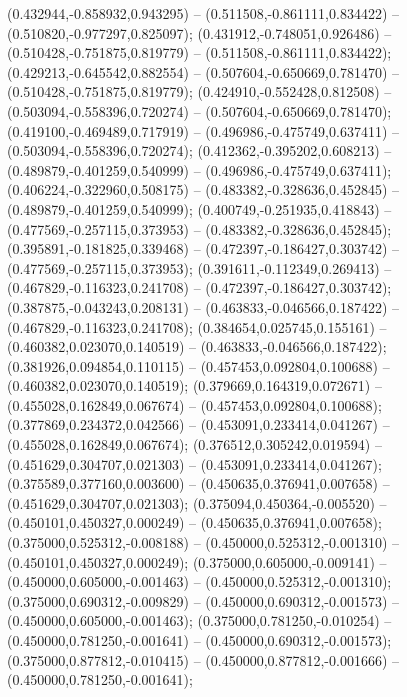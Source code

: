  (0.432944,-0.858932,0.943295) -- (0.511508,-0.861111,0.834422) -- (0.510820,-0.977297,0.825097);
 (0.431912,-0.748051,0.926486) -- (0.510428,-0.751875,0.819779) -- (0.511508,-0.861111,0.834422);
 (0.429213,-0.645542,0.882554) -- (0.507604,-0.650669,0.781470) -- (0.510428,-0.751875,0.819779);
 (0.424910,-0.552428,0.812508) -- (0.503094,-0.558396,0.720274) -- (0.507604,-0.650669,0.781470);
 (0.419100,-0.469489,0.717919) -- (0.496986,-0.475749,0.637411) -- (0.503094,-0.558396,0.720274);
 (0.412362,-0.395202,0.608213) -- (0.489879,-0.401259,0.540999) -- (0.496986,-0.475749,0.637411);
 (0.406224,-0.322960,0.508175) -- (0.483382,-0.328636,0.452845) -- (0.489879,-0.401259,0.540999);
 (0.400749,-0.251935,0.418843) -- (0.477569,-0.257115,0.373953) -- (0.483382,-0.328636,0.452845);
 (0.395891,-0.181825,0.339468) -- (0.472397,-0.186427,0.303742) -- (0.477569,-0.257115,0.373953);
 (0.391611,-0.112349,0.269413) -- (0.467829,-0.116323,0.241708) -- (0.472397,-0.186427,0.303742);
 (0.387875,-0.043243,0.208131) -- (0.463833,-0.046566,0.187422) -- (0.467829,-0.116323,0.241708);
 (0.384654,0.025745,0.155161) -- (0.460382,0.023070,0.140519) -- (0.463833,-0.046566,0.187422);
 (0.381926,0.094854,0.110115) -- (0.457453,0.092804,0.100688) -- (0.460382,0.023070,0.140519);
 (0.379669,0.164319,0.072671) -- (0.455028,0.162849,0.067674) -- (0.457453,0.092804,0.100688);
 (0.377869,0.234372,0.042566) -- (0.453091,0.233414,0.041267) -- (0.455028,0.162849,0.067674);
 (0.376512,0.305242,0.019594) -- (0.451629,0.304707,0.021303) -- (0.453091,0.233414,0.041267);
 (0.375589,0.377160,0.003600) -- (0.450635,0.376941,0.007658) -- (0.451629,0.304707,0.021303);
 (0.375094,0.450364,-0.005520) -- (0.450101,0.450327,0.000249) -- (0.450635,0.376941,0.007658);
 (0.375000,0.525312,-0.008188) -- (0.450000,0.525312,-0.001310) -- (0.450101,0.450327,0.000249);
 (0.375000,0.605000,-0.009141) -- (0.450000,0.605000,-0.001463) -- (0.450000,0.525312,-0.001310);
 (0.375000,0.690312,-0.009829) -- (0.450000,0.690312,-0.001573) -- (0.450000,0.605000,-0.001463);
 (0.375000,0.781250,-0.010254) -- (0.450000,0.781250,-0.001641) -- (0.450000,0.690312,-0.001573);
 (0.375000,0.877812,-0.010415) -- (0.450000,0.877812,-0.001666) -- (0.450000,0.781250,-0.001641);
